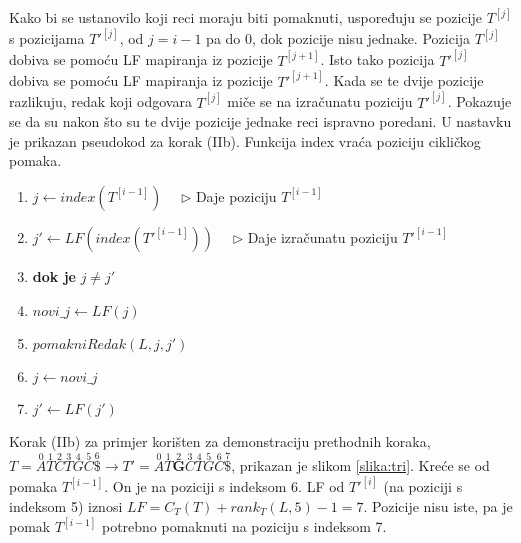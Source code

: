 \documentclass{ferseminar}
\begin{document}
Kako bi se ustanovilo koji reci moraju biti pomaknuti, uspoređuju se pozicije $T^{[j]}$ s pozicijama $T'^{[j]}$, od $j=i-1$ pa do $0$, dok pozicije nisu jednake. Pozicija $T^{[j]}$ dobiva se pomoću LF mapiranja iz pozicije $T^{[j+1]}$. Isto tako pozicija $T'^{[j]}$ dobiva se pomoću LF mapiranja iz pozicije $T'^{[j+1]}$. Kada se te dvije pozicije razlikuju, redak koji odgovara $T^{[j]}$ miče se na izračunatu poziciju $T'^{[j]}$. Pokazuje se da su nakon što su te dvije pozicije jednake reci ispravno poredani.
U nastavku je prikazan pseudokod za korak (IIb). Funkcija index vraća poziciju cikličkog pomaka.
\footnotesize
\begin{enumerate}
	\item $j\longleftarrow index(T^{[i-1]}) \quad$ $\triangleright$ Daje poziciju $T^{[i-1]}$
	\item $j'\longleftarrow LF(index(T'^{[i-1]})) \quad$ $\triangleright$ Daje izračunatu poziciju $T'^{[i-1]}$
	\item \textbf{dok je} $j\neq j'$
	\item \hspace{.1\textwidth} $novi\_j \longleftarrow LF(j) $
	\item \hspace{.1\textwidth} $pomakniRedak(L,j,j')$
	\item \hspace{.1\textwidth} $j \longleftarrow novi\_j $
	\item \hspace{.1\textwidth} $j' \longleftarrow LF(j') $
\end{enumerate}
\normalsize

Korak (IIb) za primjer korišten za demonstraciju prethodnih koraka, $
	T=\overset{0}{A}	\overset{1}{T} \overset{2}{C} \overset{3}{T}	\overset{4}{G}
	\overset{5}{C}	\overset{6}{\$} \rightarrow		
	T'=\overset{0}{A}	\overset{1}{T}	\overset{2}{\boldsymbol{G}}  \overset{3}{C} \overset{4}{T}	\overset{5}{G}
	\overset{6}{C}	\overset{7}{\$} 	
$,  prikazan je slikom \ref{slika:tri}. Kreće se od pomaka $T^{[i-1]}$. On je na poziciji s indeksom 6. LF od $T'^{[i]}$ (na poziciji s indeksom 5) iznosi $LF=C_T(T)+rank_T(L,5)-1=7$. Pozicije nisu iste, pa je pomak $T^{[i-1]}$ potrebno pomaknuti na poziciju s indeksom 7.
\end{document}
